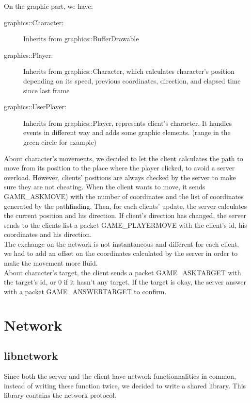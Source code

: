 \documentclass{scrreprt}
\begin{document}
				On the graphic part, we have:
				\begin{description}
				\item[graphics::Character:]{Inherits from graphics::BufferDrawable}
				\item[graphics::Player:]{Inherits from graphics::Character, which calculates character's position depending on its speed, previous coordinates, direction, and elapsed time since last frame}
				\item[graphics::UserPlayer:]{Inherits from graphics::Player, represents client's character. It handles events in different way and adds some graphic elements. (range in the green circle for example)}
				\end{description}

				About character's movements, we decided to let the client calculates the path to move from its position to the place where the player clicked, to avoid a server overload. However, clients' positions are always checked by the server to make sure they are not cheating. When the client wants to move, it sends GAME\_ASKMOVE) with the number of coordinates and the list of coordinates generated by the pathfinding. Then, for each clients' update, the server calculates the current position and his direction. If client's direction has changed, the server sends to the clients list a packet GAME\_PLAYERMOVE with the client's id, his coordinates and his direction.\\
			The exchange on the network is not instantaneous and different for each client, we had to add an offset on the coordinates calculated by the server in order to make the movement more fluid.\\

			About character's target, the client sends a packet GAME\_ASKTARGET with the target's id, or 0 if it hasn't any target. If the target is okay, the server answer with a packet  GAME\_ANSWERTARGET to confirm.

			\chapter{Network}
			\section{libnetwork}
			Since both the server and the client have network functionnalities in common, instead of writing these function twice, we decided to write a shared library. This library contains the network protocol.\\
\end{document}
